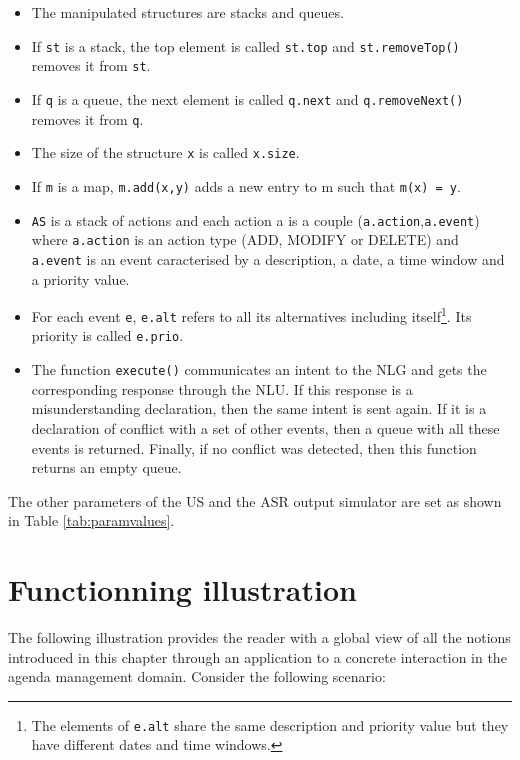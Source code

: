 				\begin{itemize}
					\item The manipulated structures are stacks and queues.
					\item If \texttt{st} is a stack, the top element is called \texttt{st.top} and \texttt{st.removeTop()} removes it from \texttt{st}.
					\item If \texttt{q} is a queue, the next element is called \texttt{q.next} and \texttt{q.removeNext()} removes it from \texttt{q}.
					\item The size of the structure \texttt{x} is called \texttt{x.size}.
					\item If \texttt{m} is a map, \texttt{m.add(x,y)} adds a new entry to m such that \texttt{m(x) = y}.
					\item \texttt{AS} is a stack of actions and each action a is a couple (\texttt{a.action},\texttt{a.event}) where \texttt{a.action} is an action type (ADD, MODIFY or DELETE) and \texttt{a.event} is an event caracterised by a description, a date, a time window and a priority value.
					\item For each event \texttt{e}, \texttt{e.alt} refers to all its alternatives including itself\footnote{The elements of \texttt{e.alt} share the same description and priority value but they have different dates and time windows.}. Its priority is called \texttt{e.prio}.
					\item The function \texttt{execute()} communicates an intent to the NLG and gets the corresponding response through the NLU. If this response is a misunderstanding declaration, then the same intent is sent again. If it is a declaration of conflict with a set of other events, then a queue with all these events is returned. Finally, if no conflict was detected, then this function returns an empty queue.
				\end{itemize}
						
					The other parameters of the US and the ASR output simulator are set as shown in Table \ref{tab:paramvalues}.
					
\section{Functionning illustration}
			
				The following illustration provides the reader with a global view of all the notions introduced in this chapter through an application to a concrete interaction in the agenda management domain. Consider the following scenario:
				
